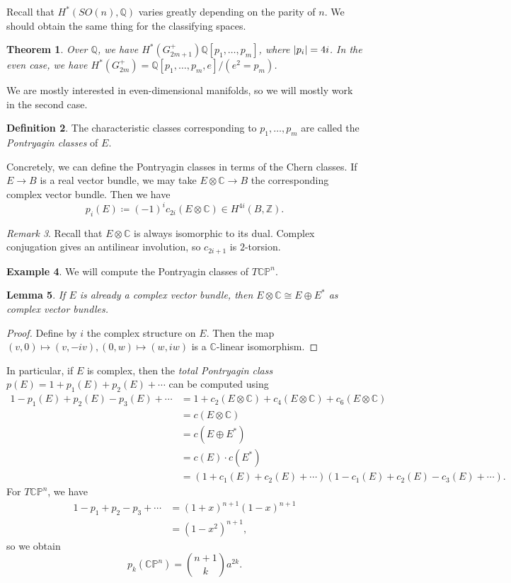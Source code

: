 \documentclass[leqno, openany]{memoir}
\newtheorem{thm}{Theorem}[section]
\newtheorem{lem}[thm]{Lemma}
\theoremstyle{definition}
\newtheorem{defn}[thm]{Definition}
\newtheorem{exm}[thm]{Example}
\theoremstyle{remark}
\newtheorem{rmk}[thm]{Remark}
\theoremstyle{plain}
\theoremstyle{definition}
\theoremstyle{remark}
\newcommand{\C}{\mathbb{C}}
\newcommand{\Z}{\mathbb{Z}}
\newcommand{\Q}{\mathbb{Q}}
\renewcommand{\P}{\mathbb{P}}
\begin{document}
Recall that $H^*(SO(n), \Q)$ varies greatly depending on the parity of $n$. We
should obtain the same thing for the classifying spaces.

\begin{thm} Over $\Q$, we have $H^*(G_{2m+1}^+) \Q[p_1, \ldots, p_m]$, where
$\abs{p_i} = 4i$. In the even case, we have $H^*(G_{2m}^+) = \Q[p_1, \ldots,
p_m, e]/(e^2=p_m)$.  \end{thm} We are mostly interested in even-dimensional
manifolds, so we will mostly work in the second case.

\begin{defn} The characteristic classes corresponding to $p_1, \ldots, p_m$ are
called the \textit{Pontryagin classes} of $E$.  \end{defn}

Concretely, we can define the Pontryagin classes in terms of the Chern classes.
If $E \to B$ is a real vector bundle, we may take $E \otimes \C \to B$ the
corresponding complex vector bundle. Then we have \[ p_i(E) \coloneqq {(-1)}^i
c_{2i}(E \otimes \C) \in H^{4i}(B, \Z). \]

\begin{rmk} Recall that $E \otimes \C$ is always isomorphic to its dual.
Complex conjugation gives an antilinear involution, so $c_{2i+1}$ is
$2$-torsion.  \end{rmk}

\begin{exm} We will compute the Pontryagin classes of $T\C\P^n$.  \end{exm}

\begin{lem} If $E$ is already a complex vector bundle, then $E \otimes \C \cong
E \oplus E^*$ as complex vector bundles.  \end{lem}

\begin{proof} Define by $i$ the complex structure on $E$. Then the map $(v,0)
\mapsto (v,-iv), (0,w) \mapsto (w,iw)$ is a $\C$-linear isomorphism.
\end{proof}

In particular, if $E$ is complex, then the \textit{total Pontryagin class}
$p(E) = 1 + p_1(E) + p_2(E) + \cdots$ can be computed using \begin{align*} 1 -
    p_1(E) + p_2(E) - p_3(E) + \cdots &= 1 + c_2(E \otimes \C) + c_4(E \otimes
    \C) + c_6(E \otimes \C) \\ &= c(E \otimes \C) \\ &= c(E \oplus E^*) \\ &=
    c(E) \cdot c(E^*) \\ &= (1 + c_1(E) + c_2(E) + \cdots) (1-c_1(E) + c_2(E) -
    c_3(E) + \cdots).  \end{align*} For $T\C\P^n$, we have \begin{align*} 1 -
    p_1 + p_2 - p_3 + \cdots &= {(1+x)}^{n+1} {(1-x)}^{n+1} \\ &=
    {(1-x^2)}^{n+1}, \end{align*} so we obtain \[ p_k(\C\P^n) = \binom{n+1}{k}
a^{2k}. \]
\end{document}
